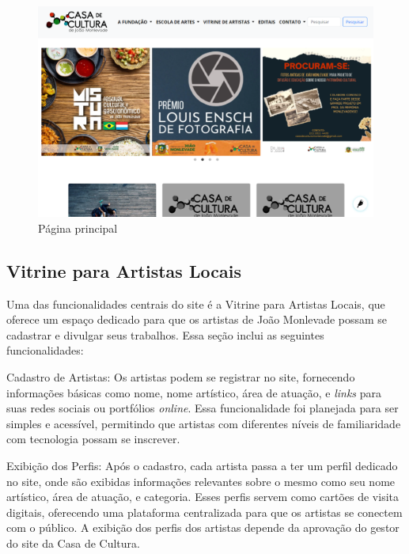 \begin{figure}[htb]
	\caption{\label{fig_pagina_principal}Página principal}
	\begin{center}
	    \includegraphics[scale=0.35]{./img/pagina_principal.png}
	\end{center}
\end{figure}


\subsection{Vitrine para Artistas Locais}

Uma das funcionalidades centrais do site é a Vitrine para Artistas Locais, que oferece um espaço dedicado para que os artistas de João Monlevade possam se cadastrar e divulgar seus trabalhos. Essa seção inclui as seguintes funcionalidades:

Cadastro de Artistas: Os artistas podem se registrar no site, fornecendo informações básicas como nome, nome artístico, área de atuação, e \textit{links} para suas redes sociais ou portfólios \textit{online}. Essa funcionalidade foi planejada para ser simples e acessível, permitindo que artistas com diferentes níveis de familiaridade com tecnologia possam se inscrever.

Exibição dos Perfis: Após o cadastro, cada artista passa a ter um perfil dedicado no site, onde são exibidas informações relevantes sobre o mesmo como seu nome artístico, área de atuação, e categoria. Esses perfis servem como cartões de visita digitais, oferecendo uma plataforma centralizada para que os artistas se conectem com o público. A exibição dos perfis dos artistas depende da aprovação do gestor do site da Casa de Cultura.

